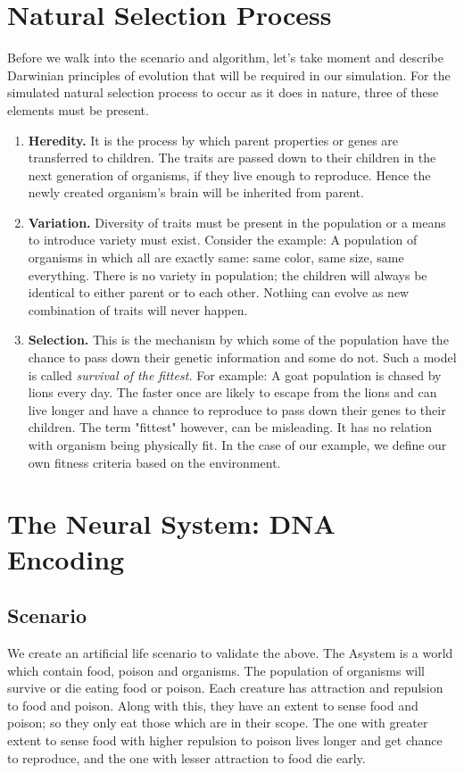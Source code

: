 \documentclass[conference]{IEEEtran}
\begin{document}
\section{Natural Selection Process}
Before we walk into the scenario and algorithm, let's take moment and describe Darwinian principles of evolution that will be required in our simulation. For the simulated natural selection process to occur as it does in nature, three of these elements must be present.
\begin{enumerate}
\item \textbf{Heredity.} It is the process by which parent properties or genes are transferred to children. The traits are passed down to their children in the next generation of organisms, if they live enough to reproduce. Hence the newly created organism's brain will be inherited from parent.
\item \textbf{Variation.} Diversity of traits must be present in the population or a means to introduce variety must exist. Consider the example: A population of organisms in which all are exactly same: same color, same size, same everything. There is no variety in population; the children will always be identical to either parent or to each other. Nothing can evolve as new combination of traits will never happen.
\item \textbf{Selection.} This is the mechanism by which some of the population have the chance to pass down their genetic information and some do not. Such a model is called \textit{survival of the fittest.}
For example: A goat population is chased by lions every day. The faster once are likely to escape from the lions and can live longer and have a chance to reproduce to pass down their genes to their children. The term "fittest" however, can be misleading. It has no relation with organism being physically fit. In the case of our example, we define our own fitness criteria based on the environment.
\end{enumerate}

\section{The Neural System: DNA Encoding}
\subsection{Scenario}
We create an artificial life scenario to validate the above. The Asystem is a world which contain food, poison and organisms. The population of organisms will survive or die eating food or poison. Each creature has attraction and repulsion to food and poison. Along with this, they have an extent to sense food and poison; so they only eat those which are in their scope. The one with greater extent to sense food with higher repulsion to poison lives longer and get chance to reproduce, and the one with lesser attraction to food die early.
\end{document}
